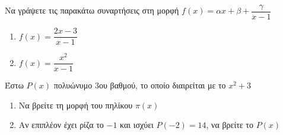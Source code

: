 \documentclass[greek]{beamer}
\begin{document}
\begin{askisi}
  Να γράψετε τις παρακάτω συναρτήσεις στη μορφή $f(x)=αx+β+\dfrac{γ}{x-1}$
  \begin{enumerate}
    \item<1-> $f(x)=\dfrac{2x-3}{x-1}$
    \item<2-> $f(x)=\dfrac{x^2}{x-1}$
  \end{enumerate}

\end{askisi}

\begin{askisi}
  Έστω $P(x)$ πολυώνυμο 3ου βαθμού, το οποίο διαιρείται με το $x^2+3$
  \begin{enumerate}
    \item<1-> Να βρείτε τη μορφή του πηλίκου $π(x)$
    \item<2-> Αν επιπλέον έχει ρίζα το $-1$ και ισχύει $P(-2)=14$, να βρείτε το $P(x)$
  \end{enumerate}


\end{askisi}


%
%
%
%
%
%
%
\end{document}
